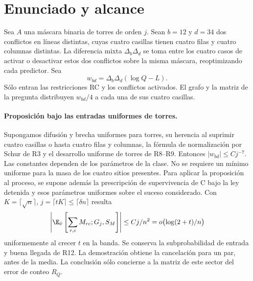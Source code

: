 \section{Enunciado y alcance}
Sea $A$ una máscara binaria de torres de orden $j$. Sean $b=12$ y $d=34$ dos conflictos
en líneas distintas, cuyas cuatro casillas tienen cuatro filas y cuatro columnas distintas.
La diferencia mixta $\Delta_b\Delta_d$ se toma entre los cuatro casos de activar o desactivar
estos dos conflictos sobre la misma máscara, reoptimizando cada predictor. Sea
\[
 w_{bd}=\Delta_b\Delta_d(\log Q-L).
\]
Sólo entran las restricciones RC y los conflictos activados. El grafo y la matriz de la
pregunta distribuyen $w_{bd}/4$ a cada una de sus cuatro casillas.
\paragraph{Proposición bajo las entradas uniformes de torres.}
Supongamos difusión y brecha uniformes para torres, su herencia al suprimir cuatro
casillas o hasta cuatro filas y columnas, la fórmula de normalización por Schur de R3
y el desarrollo uniforme de torres de R8--R9. Entonces $|w_{bd}|\le Cj^{-7}$.
Las constantes dependen de los parámetros de la clase. No se requiere un mínimo
uniforme para la masa de los cuatro sitios presentes.
Para aplicar la proposición al proceso, se supone además la prescripción de supervivencia
de C bajo la ley detenida y esos parámetros uniformes sobre el suceso considerado.
Con $K=\lceil\sqrt n\rceil$, $j=\lceil tK\rceil\le\lceil\delta n\rceil$ resulta
\[
 \left|\E_{\bar\nu}\left[\sum_{r,c} M_{rc};G_j,S_M\right]\right|
 \le Cj/n^2=o\bigl(\log(2+t)/n\bigr)
\]
uniformemente al crecer $t$ en la banda. Se conserva la subprobabilidad de entrada y
buena llegada de R12. La demostración obtiene la cancelación para un par, antes de la media.
La conclusión sólo concierne a la matriz de este sector del error de conteo $R_Q$.
